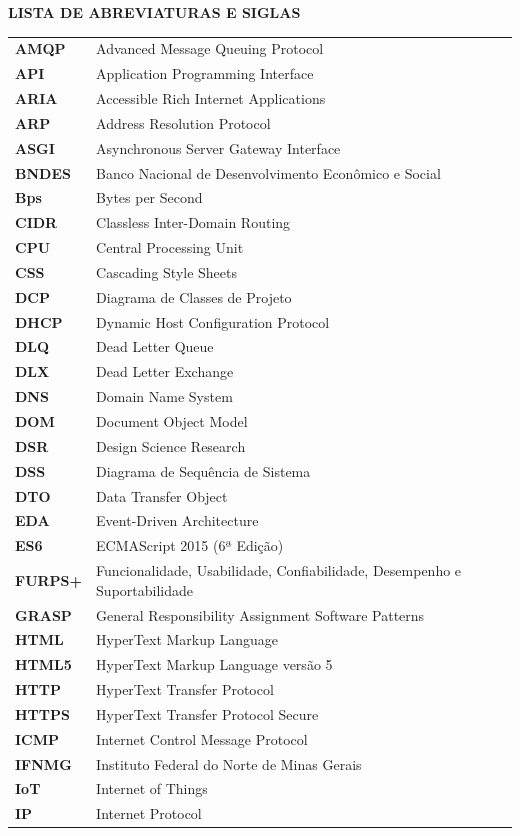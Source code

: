 \documentclass[12pt,a4paper]{article}
\newcommand{\pretextualtitle}[1]{\begin{center}\textbf{\MakeUppercase{#1}}\end{center}\vspace{1em}}
\begin{document}
\pretextualtitle{LISTA DE ABREVIATURAS E SIGLAS}
\begin{longtable}{@{}>{\bfseries}p{2.2cm}p{11.5cm}@{}}
AMQP & Advanced Message Queuing Protocol \\
API & Application Programming Interface \\
ARIA & Accessible Rich Internet Applications \\
ARP & Address Resolution Protocol \\
ASGI & Asynchronous Server Gateway Interface \\
BNDES & Banco Nacional de Desenvolvimento Econômico e Social \\
Bps & Bytes per Second \\
CIDR & Classless Inter-Domain Routing \\
CPU & Central Processing Unit \\
CSS & Cascading Style Sheets \\
DCP & Diagrama de Classes de Projeto \\
DHCP & Dynamic Host Configuration Protocol \\
DLQ & Dead Letter Queue \\
DLX & Dead Letter Exchange \\
DNS & Domain Name System \\
DOM & Document Object Model \\
DSR & Design Science Research \\
DSS & Diagrama de Sequência de Sistema \\
DTO & Data Transfer Object \\
EDA & Event-Driven Architecture \\
ES6 & ECMAScript 2015 (6ª Edição) \\
FURPS+ & Funcionalidade, Usabilidade, Confiabilidade, Desempenho e Suportabilidade \\
GRASP & General Responsibility Assignment Software Patterns \\
HTML & HyperText Markup Language \\
HTML5 & HyperText Markup Language versão 5 \\
HTTP & HyperText Transfer Protocol \\
HTTPS & HyperText Transfer Protocol Secure \\
ICMP & Internet Control Message Protocol \\
IFNMG & Instituto Federal do Norte de Minas Gerais \\
IoT & Internet of Things \\
IP & Internet Protocol \\

\end{longtable}
\end{document}
